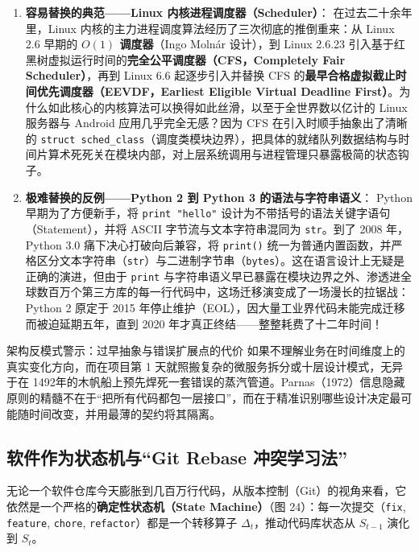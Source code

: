 \documentclass[a4paper]{article}
\begin{document}
\begin{enumerate}
    \item \textbf{容易替换的典范——Linux 内核进程调度器（Scheduler）}：
    在过去二十余年里，Linux 内核的主力进程调度算法经历了三次彻底的推倒重来：从 Linux 2.6 早期的 \textbf{$O(1)$ 调度器}（Ingo Moln\'{a}r 设计），到 Linux 2.6.23 引入基于红黑树虚拟运行时间的\textbf{完全公平调度器（CFS，Completely Fair Scheduler）}，再到 Linux 6.6 起逐步引入并替换 CFS 的\textbf{最早合格虚拟截止时间优先调度器（EEVDF，Earliest Eligible Virtual Deadline First）}。为什么如此核心的内核算法可以换得如此丝滑，以至于全世界数以亿计的 Linux 服务器与 Android 应用几乎完全无感？因为 CFS 在引入时顺手抽象出了清晰的 \texttt{struct sched\_class}（调度类模块边界），把具体的就绪队列数据结构与时间片算术死死关在模块内部，对上层系统调用与进程管理只暴露极简的状态钩子。
    \item \textbf{极难替换的反例——Python 2 到 Python 3 的语法与字符串语义}：
    Python 早期为了方便新手，将 \texttt{print "hello"} 设计为不带括号的语法关键字语句（Statement），并将 ASCII 字节流与文本字符串混同为 \texttt{str}。到了 2008 年，Python 3.0 痛下决心打破向后兼容，将 \texttt{print()} 统一为普通内置函数，并严格区分文本字符串（\texttt{str}）与二进制字节串（\texttt{bytes}）。这在语言设计上无疑是正确的演进，但由于 \texttt{print} 与字符串语义早已暴露在模块边界之外、渗透进全球数百万个第三方库的每一行代码中，这场迁移演变成了一场漫长的拉锯战：Python 2 原定于 2015 年停止维护（EOL），因大量工业界代码未能完成迁移而被迫延期五年，直到 2020 年才真正终结——整整耗费了十二年时间！
\end{enumerate}

\begin{warningbox}{架构反模式警示：过早抽象与错误扩展点的代价}
如果不理解业务在时间维度上的真实变化方向，而在项目第 1 天就照搬复杂的微服务拆分或十层设计模式，无异于在 1492年的木帆船上预先焊死一套错误的蒸汽管道。Parnas（1972）信息隐藏原则的精髓不在于“把所有代码都包一层接口”，而在于精准识别哪些设计决定最可能随时间改变，并用最薄的契约将其隔离。
\end{warningbox}

\subsection{软件作为状态机与“Git Rebase 冲突学习法”}

无论一个软件仓库今天膨胀到几百万行代码，从版本控制（Git）的视角来看，它依然是一个严格的\textbf{确定性状态机（State Machine）}（图 24）：每一次提交（\texttt{fix}, \texttt{feature}, \texttt{chore}, \texttt{refactor}）都是一个转移算子 $\Delta_t$，推动代码库状态从 $S_{t-1}$ 演化到 $S_t$。
\end{document}
